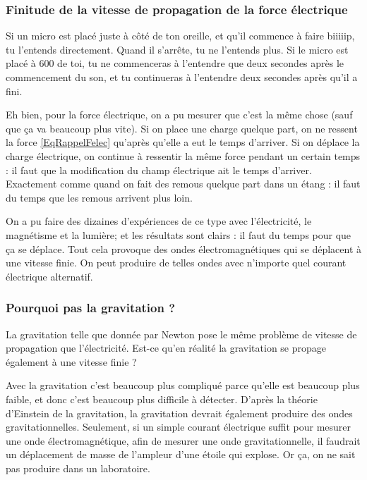 \subsubsection{Finitude de la vitesse de propagation de la force électrique}

Si un micro est placé juste à côté de ton oreille, et qu'il commence à faire biiiiip, tu l'entends directement. Quand il s'arrête, tu ne l'entends plus. Si le micro est placé à \unit{600}{\meter} de toi, tu ne commenceras à l'entendre que deux secondes après le commencement du son, et tu continueras à l'entendre deux secondes après qu'il a fini.

Eh bien, pour la force électrique, on a pu mesurer que c'est la même chose (sauf que ça va beaucoup plus vite). Si on place une charge quelque part, on ne ressent la force \eqref{EqRappelFelec} qu'après qu'elle a eut le temps d'arriver. Si on déplace la charge électrique, on continue à ressentir la même force pendant un certain temps : il faut que la modification du champ électrique ait le temps d'arriver. Exactement comme quand on fait des remous quelque part dans un étang : il faut du temps que les remous arrivent plus loin.

On a pu faire des dizaines d'expériences de ce type avec l'électricité, le magnétisme et la lumière; et les résultats sont clairs : il faut du temps pour que ça se déplace. Tout cela provoque des ondes électromagnétiques qui se déplacent à une vitesse finie. On peut produire de telles ondes avec n'importe quel courant électrique alternatif.

\subsubsection{Pourquoi pas la gravitation ?}

La gravitation telle que donnée par Newton pose le même problème de vitesse de propagation que l'électricité. Est-ce qu'en réalité la gravitation se propage également à une vitesse finie ?

Avec la gravitation c'est beaucoup plus compliqué parce qu'elle est beaucoup plus faible, et donc c'est beaucoup plus difficile à détecter. D'après la théorie d'Einstein de la gravitation, la gravitation devrait également produire des ondes gravitationnelles. Seulement, si un simple courant électrique suffit pour mesurer une onde électromagnétique, afin de mesurer une onde gravitationnelle, il faudrait un déplacement de masse de l'ampleur d'une étoile qui explose. Or ça, on ne sait pas produire dans un laboratoire.


